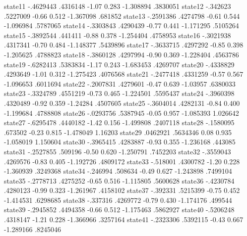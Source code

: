      state11 {\VBAR}  -.4629443   .4316148    -1.07   0.283    -1.308894    .3830051
     state12 {\VBAR}   -.342623   .5227009    -0.66   0.512    -1.367098     .681852
     state13 {\VBAR}  -.2591386   .4274798    -0.61   0.544    -1.096984    .5787065
     state14 {\VBAR}  -.3303843   .4290439    -0.77   0.441    -1.171295    .5105264
     state15 {\VBAR}  -.3892544    .441411    -0.88   0.378    -1.254404    .4758953
     state16 {\VBAR}  -.3021938   .4317341    -0.70   0.484    -1.148377    .5439896
     state17 {\VBAR}  -.3633715   .4297292    -0.85   0.398    -1.205625    .4788823
     state18 {\VBAR}  -.3860128   .4297994    -0.90   0.369    -1.228404    .4563786
     state19 {\VBAR}  -.6282413   .5383834    -1.17   0.243    -1.683453    .4269707
     state20 {\VBAR}  -.4338829   .4293649    -1.01   0.312    -1.275423    .4076568
     state21 {\VBAR}  -.2477418   .4331259    -0.57   0.567    -1.096653    .6011694
     state22 {\VBAR}  -.2007831   .4279601    -0.47   0.639     -1.03957    .6380033
     state23 {\VBAR}  -.3324789   .4551219    -0.73   0.465    -1.224501    .5595437
     state24 {\VBAR}  -.3960398   .4320489    -0.92   0.359     -1.24284    .4507605
     state25 {\VBAR}  -.3604014   .4282131    -0.84   0.400    -1.199684    .4788808
     state26 {\VBAR}  -.0293756   .5387945    -0.05   0.957    -1.085393    1.026642
     state27 {\VBAR}  -.6295478   .4440182    -1.42   0.156    -1.499808    .2407118
     state28 {\VBAR}  -.1580095    .673502    -0.23   0.815    -1.478049     1.16203
     state29 {\VBAR}   .0462921   .5634346     0.08   0.935    -1.058019    1.150604
     state30 {\VBAR}  -.3965415   .4283887    -0.93   0.355    -1.236168     .443085
     state31 {\VBAR}  -.2527855    .509196    -0.50   0.620    -1.250791    .7452203
     state32 {\VBAR}  -.3559043   .4269576    -0.83   0.405    -1.192726    .4809172
     state33 {\VBAR}   -.518001   .4300782    -1.20   0.228    -1.360939    .3249368
     state34 {\VBAR}   -.246994    .508634    -0.49   0.627    -1.243898    .7499104
     state35 {\VBAR}  -.2778713   .4275252    -0.65   0.516    -1.115805    .5600628
     state36 {\VBAR}  -.4230784   .4280123    -0.99   0.323    -1.261967    .4158102
     state37 {\VBAR}   -.392331   .5215399    -0.75   0.452    -1.414531    .6298685
     state38 {\VBAR}   -.337316   .4269772    -0.79   0.430    -1.174176     .499544
     state39 {\VBAR}  -.2945852   .4494358    -0.66   0.512    -1.175463    .5862927
     state40 {\VBAR}  -.5206248   .4318147    -1.21   0.228    -1.366966    .3257164
     state41 {\VBAR}  -.2323306   .5392115    -0.43   0.667    -1.289166    .8245046
